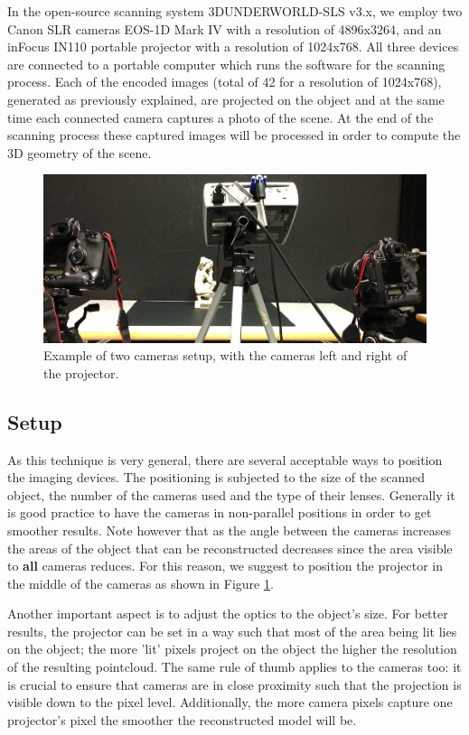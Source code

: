 \documentclass[final,12pt,3p]{elsarticle}
\begin{document}
In the open-source scanning system 3DUNDERWORLD-SLS v3.x, we employ two Canon SLR cameras EOS-1D Mark IV with a resolution of 4896x3264, and an inFocus IN110 portable projector with a resolution of 1024x768. All three devices are connected to a portable computer which runs the software for the scanning process. Each of the encoded images (total of 42 for a resolution of 1024x768), generated as previously explained, are projected on the object and at the same time each connected camera captures a photo of the scene. At the end of the scanning process these captured images will be processed in order to compute the 3D geometry of the scene.

\begin{figure}[!ht]
	\centering	
	\includegraphics[scale=0.24]{./setup.jpg}
	\caption{\label{fig:setup} Example of two cameras setup, with the cameras left and right of the projector.}
\end{figure}

\vspace{-20pt}
\subsection{Setup}
\label{subsec:setup}
As this technique is very general, there are several acceptable ways to position the imaging devices. The positioning is subjected to the size of the scanned object, the number of the cameras used and the type of their lenses. Generally it is good practice to have the cameras in non-parallel positions in order to get smoother results. Note however that as the angle between the cameras increases the areas of the object that can be reconstructed decreases since the area visible to \textbf{all} cameras reduces. For this reason, we suggest to position the projector in the middle of the cameras as shown in Figure \ref{fig:setup}.

Another important aspect is to adjust the optics to the object's size. For better results, the projector can be set in a way such that most of the area being lit lies on the object; the more 'lit' pixels project on the object the higher the resolution of the resulting pointcloud. The same rule of thumb applies to the cameras too: it is crucial to ensure that cameras are in close proximity such that the projection is visible down to the pixel level. Additionally, the more camera pixels capture one projector's pixel the smoother the reconstructed model will be. 
\end{document}
